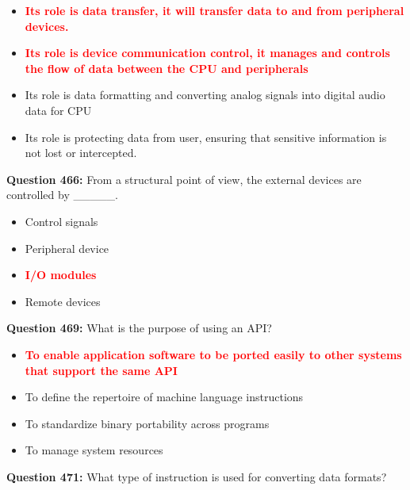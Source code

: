 \documentclass[12pt,a4paper]{article}
\begin{document}
\begin{itemize}
    \item[\textbf{A.}] \textcolor{red}{\textbf{Its role is data transfer, it will transfer data to and from peripheral devices.}}
    \item[\textbf{B.}] \textcolor{red}{\textbf{Its role is device communication control, it manages and controls the flow of data between the CPU and peripherals}}
    \item[\textbf{C.}] Its role is data formatting and converting analog signals into digital audio data for CPU
    \item[\textbf{D.}] Its role is protecting data from user, ensuring that sensitive information is not lost or intercepted.
\end{itemize}

\vspace{0.5cm}

\textbf{Question 466:} From a structural point of view, the external devices are controlled by _____.

\begin{itemize}
    \item[\textbf{A.}] Control signals
    \item[\textbf{B.}] Peripheral device
    \item[\textbf{C.}] \textcolor{red}{\textbf{I/O modules}}
    \item[\textbf{D.}] Remote devices
\end{itemize}

\vspace{0.5cm}

\textbf{Question 469:} What is the purpose of using an API?

\begin{itemize}
    \item[\textbf{A.}] \textcolor{red}{\textbf{To enable application software to be ported easily to other systems that support the same API}}
    \item[\textbf{B.}] To define the repertoire of machine language instructions
    \item[\textbf{C.}] To standardize binary portability across programs
    \item[\textbf{D.}] To manage system resources
\end{itemize}

\vspace{0.5cm}

\textbf{Question 471:} What type of instruction is used for converting data formats?
\end{document}
